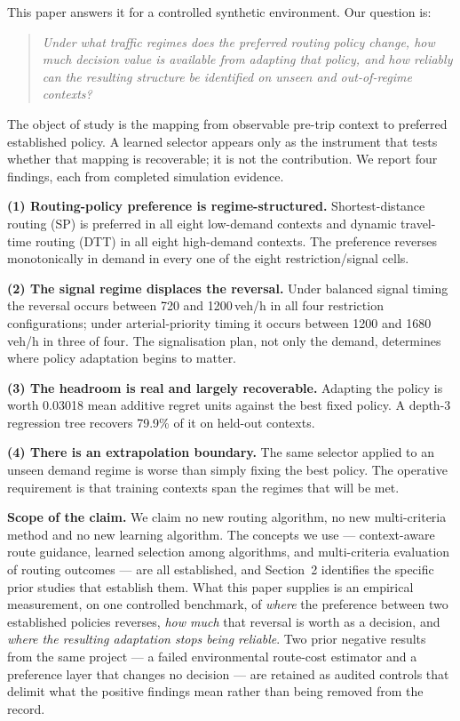 \documentclass[10pt,a4paper]{article}
\begin{document}
This paper answers it for a controlled synthetic environment. Our question is:
\begin{quote}
\emph{Under what traffic regimes does the preferred routing policy change, how much decision value is available from adapting that policy, and how reliably can the resulting structure be identified on unseen and out-of-regime contexts?}
\end{quote}

The object of study is the mapping from observable pre-trip context to preferred established policy. A learned selector appears only as the instrument that tests whether that mapping is recoverable; it is not the contribution. We report four findings, each from completed simulation evidence.

\textbf{(1) Routing-policy preference is regime-structured.} Shortest-distance routing (SP) is preferred in all eight low-demand contexts and dynamic travel-time routing (DTT) in all eight high-demand contexts. The preference reverses monotonically in demand in every one of the eight restriction/signal cells.

\textbf{(2) The signal regime displaces the reversal.} Under balanced signal timing the reversal occurs between 720 and 1200\,veh/h in all four restriction configurations; under arterial-priority timing it occurs between 1200 and 1680\,veh/h in three of four. The signalisation plan, not only the demand, determines where policy adaptation begins to matter.

\textbf{(3) The headroom is real and largely recoverable.} Adapting the policy is worth 0.03018 mean additive regret units against the best fixed policy. A depth-3 regression tree recovers 79.9\% of it on held-out contexts.

\textbf{(4) There is an extrapolation boundary.} The same selector applied to an unseen demand regime is worse than simply fixing the best policy. The operative requirement is that training contexts span the regimes that will be met.

\textbf{Scope of the claim.} We claim no new routing algorithm, no new multi-criteria method and no new learning algorithm. The concepts we use --- context-aware route guidance, learned selection among algorithms, and multi-criteria evaluation of routing outcomes --- are all established, and Section~2 identifies the specific prior studies that establish them. What this paper supplies is an empirical measurement, on one controlled benchmark, of \emph{where} the preference between two established policies reverses, \emph{how much} that reversal is worth as a decision, and \emph{where the resulting adaptation stops being reliable}. Two prior negative results from the same project --- a failed environmental route-cost estimator and a preference layer that changes no decision --- are retained as audited controls that delimit what the positive findings mean rather than being removed from the record.
\end{document}
